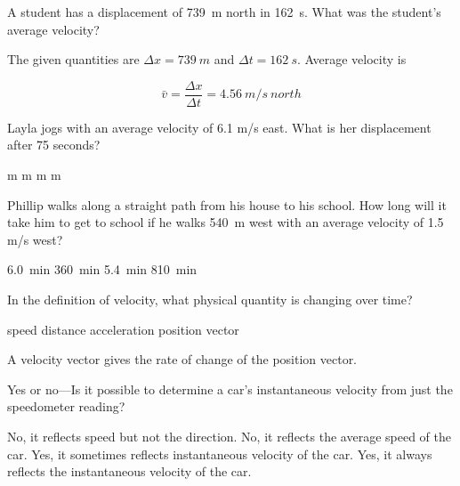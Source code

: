 \documentclass[addpoints]{exam}
\begin{document}
\begin{questions}
\question
A student has a displacement of \SI{739}{m} north in \SI{162}{s}. What was the student's average velocity?

\begin{solution}
    The given quantities are $\Delta{x} = \SI{739}{m}$ and $\Delta{t} = \SI{162}{s}$. Average velocity is

\begin{equation*}
        \bar{v} = \frac{\Delta{x}}{\Delta{t}} = \SI{4.56}{m/s\ north}
\end{equation*}
\end{solution}



\question %
Layla jogs with an average velocity of 6.1 m/s east. What is her displacement after 75 seconds?

\begin{choices}
 m
 m
 m
 m
\end{choices}


\question %
Phillip walks along a straight path from his house to his school. How long will it take him to get to school if he walks \SI{540}{m} west with an average velocity of 1.5 m/s west?

\begin{choices}
\CorrectChoice \SI{6.0}{min}
\choice \SI{360}{min}
\choice \SI{5.4}{min}
\choice \SI{810}{min}


\end{choices}

\question
In the definition of velocity, what physical quantity is changing over time?

\begin{choices}
\choice speed
\choice distance
\choice acceleration
\CorrectChoice position vector
\end{choices}

\begin{solution}
A velocity vector gives the rate of change of the position vector.
\end{solution}

\question
Yes or no---Is it possible to determine a car’s instantaneous velocity from just the speedometer reading?

\begin{choices}
\CorrectChoice No, it reflects speed but not the direction.
\choice No, it reflects the average speed of the car.
\choice Yes, it sometimes reflects instantaneous velocity of the car.
\choice Yes, it always reflects the instantaneous velocity of the car.
\end{choices}


\end{questions}
\end{document}
